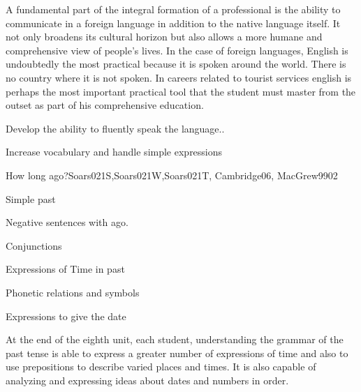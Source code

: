 \begin{syllabus}


\begin{justification}
A fundamental part of the integral formation of a professional is the ability to communicate in a foreign language in addition to the native language itself. It not only broadens its cultural horizon but also allows a more humane and comprehensive view of people's lives. In the case of foreign languages, English is undoubtedly the most practical because it is spoken around the world. There is no country where it is not spoken.
In careers related to tourist services english is perhaps the most important practical tool that the student must master from the outset as part of his comprehensive education.
\end{justification}

\begin{goals}
\item Develop the ability to fluently speak the language..
\item Increase vocabulary and handle simple expressions
\end{goals}

\begin{competences}
    \item {}
\end{competences}

\begin{outcomes}
\item {}
\item {}
\end{outcomes}

\begin{unit}{}{How long ago?}{Soars021S,Soars021W,Soars021T, Cambridge06, MacGrew99}{0}{2}
   \begin{topics}
      \item Simple past
      \item Negative sentences with ago.
      \item Conjunctions
      \item Expressions of Time in past
      \item Phonetic relations and symbols
      \item Expressions to give the date
   \end{topics}

   \begin{learningoutcomes}
      \item At the end of the eighth unit, each student, understanding the grammar of the past tense is able to express a greater number of expressions of time and also to use prepositions to describe varied places and times. It is also capable of analyzing and expressing ideas about dates and numbers in order. 
   \end{learningoutcomes}


\end{unit}
\end{syllabus}

